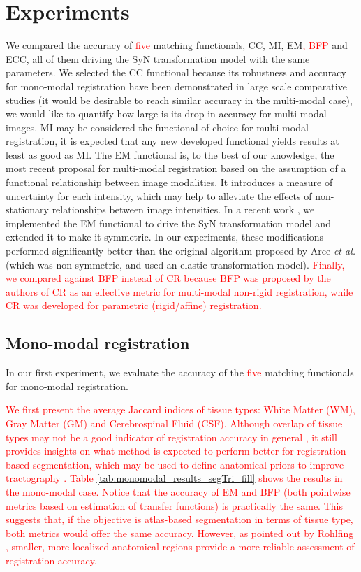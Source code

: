 \section{Experiments}
We compared the accuracy of \textcolor{red}{five} matching functionals, CC, MI, EM\textcolor{red}{, BFP} and ECC, all of them driving the SyN transformation model with the same parameters. We selected the CC functional because its robustness and accuracy for mono-modal registration have been demonstrated in large scale comparative studies \cite{Klein2009, Klein2010, Rohlfing2012} (it would be desirable to reach similar accuracy in the multi-modal case), we would like to quantify how large is its drop in accuracy for multi-modal images. MI \cite{Maes1997, Mattes2003} may be considered the functional of choice for multi-modal registration, it is expected that any new developed functional yields results at least as good as MI. The EM functional \cite{Arce-santana2014} is, to the best of our knowledge, the most recent proposal for multi-modal registration based on the assumption of a functional relationship between image modalities. It introduces a measure of uncertainty for each intensity, which may help to alleviate the effects of non-stationary relationships between image intensities. In a recent work \cite{Ocegueda2015}, we implemented the EM functional to drive the SyN transformation model and extended it to make it symmetric. In our experiments, these modifications performed significantly better than the original algorithm proposed by Arce {\it et al.} \cite{Arce-santana2014} (which was non-symmetric, and used an elastic transformation model). \textcolor{red}{Finally, we compared against BFP \cite{Guimond2001} instead of CR because BFP was proposed by the authors of CR as an effective metric for multi-modal non-rigid registration, while CR was developed for parametric (rigid/affine) registration.}

\subsection{Mono-modal registration}
In our first experiment, we evaluate the accuracy of the \textcolor{red}{five} matching functionals for mono-modal registration. \textcolor{red}{We first present the average Jaccard indices of tissue types: White Matter (WM), Gray Matter (GM) and Cerebrospinal Fluid (CSF). Although overlap of tissue types may not be a good indicator of registration accuracy in general \cite{Rohlfing2012}, it still provides insights on what method is expected to perform better for registration-based segmentation, which may be used to define anatomical priors to improve tractography \cite{Smith2012, Girard2014}. Table \ref{tab:monomodal_results_segTri_fill} shows the results in the mono-modal case. Notice that the accuracy of EM and BFP (both pointwise metrics based on estimation of transfer functions) is practically the same. This suggests that, if the objective is atlas-based segmentation in terms of tissue type, both metrics would offer the same accuracy. However, as pointed out by Rohlfing \cite{Rohlfing2012}, smaller, more localized anatomical regions provide a more reliable assessment of registration accuracy. 

}

